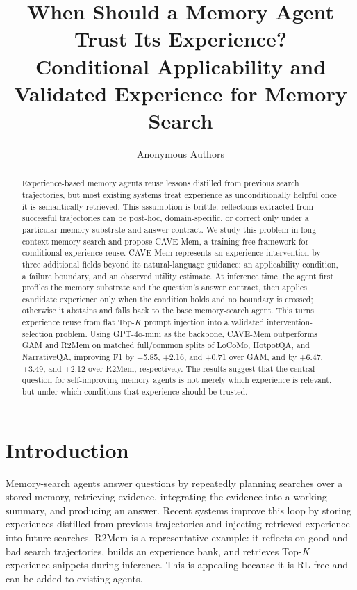 \documentclass[11pt]{article}
\title{
  When Should a Memory Agent Trust Its Experience?\\
  Conditional Applicability and Validated Experience for Memory Search
}
\author{Anonymous Authors}
\date{}
\newcommand{\method}{CAVE-Mem}
\begin{document}
\maketitle

\begin{abstract}
Experience-based memory agents reuse lessons distilled from previous search
trajectories, but most existing systems treat experience as unconditionally
helpful once it is semantically retrieved. This assumption is brittle:
reflections extracted from successful trajectories can be post-hoc,
domain-specific, or correct only under a particular memory substrate and answer
contract. We study this problem in long-context memory search and propose
\method, a training-free framework for conditional experience reuse.
\method{} represents an experience intervention by three additional fields
beyond its natural-language guidance: an applicability condition, a failure
boundary, and an observed utility estimate. At inference time, the agent first
profiles the memory substrate and the question's answer contract, then applies
candidate experience only when the condition holds and no boundary is crossed;
otherwise it abstains and falls back to the base memory-search agent. This turns
experience reuse from flat Top-$K$ prompt injection into a validated
intervention-selection problem. Using GPT-4o-mini as the backbone, \method{}
outperforms GAM and R2Mem on matched full/common splits of LoCoMo, HotpotQA,
and NarrativeQA, improving F1 by +5.85, +2.16, and +0.71 over GAM, and by
+6.47, +3.49, and +2.12 over R2Mem, respectively. The results suggest that the
central question for self-improving memory agents is not merely which
experience is relevant, but under which conditions that experience should be
trusted.
\end{abstract}

\section{Introduction}

Memory-search agents answer questions by repeatedly planning searches over a
stored memory, retrieving evidence, integrating the evidence into a working
summary, and producing an answer. Recent systems improve this loop by storing
experiences distilled from previous trajectories and injecting retrieved
experience into future searches. R2Mem is a representative example: it reflects
on good and bad search trajectories, builds an experience bank, and retrieves
Top-$K$ experience snippets during inference. This is appealing because it is
RL-free and can be added to existing agents.
\end{document}
